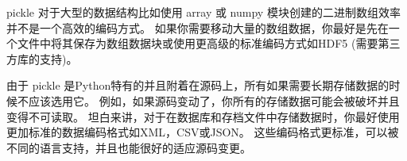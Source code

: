 pickle 对于大型的数据结构比如使用 array 或 numpy 模块创建的二进制数组效率并不是一个高效的编码方式。 如果你需要移动大量的数组数据，你最好是先在一个文件中将其保存为数组数据块或使用更高级的标准编码方式如HDF5 (需要第三方库的支持)。

由于 pickle 是Python特有的并且附着在源码上，所有如果需要长期存储数据的时候不应该选用它。 例如，如果源码变动了，你所有的存储数据可能会被破坏并且变得不可读取。 坦白来讲，对于在数据库和存档文件中存储数据时，你最好使用更加标准的数据编码格式如XML，CSV或JSON。 这些编码格式更标准，可以被不同的语言支持，并且也能很好的适应源码变更。
